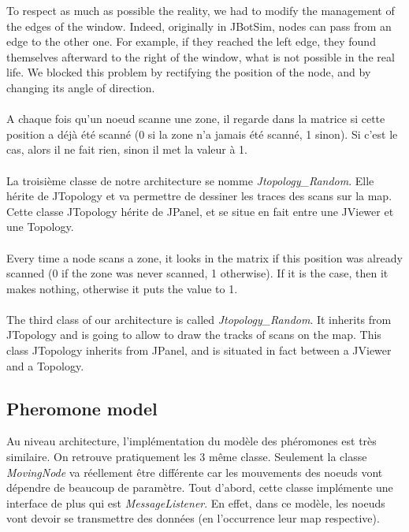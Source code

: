 To respect as much as possible the reality, we had to modify the management of the edges of the window. Indeed, originally in JBotSim, nodes can pass from an edge to the other one. For example, if they reached the left edge, they found themselves afterward to the right of the window, what is not possible in the real life. We blocked this problem by rectifying the position of the node, and by changing its angle of direction. \\\\

A chaque fois qu'un noeud scanne une zone, il regarde dans la matrice si cette position a déjà été scanné (0 si la zone n'a jamais été scanné, 1 sinon). Si c'est le cas, alors il ne fait rien, sinon il met la valeur à 1.\\\\

La troisième classe de notre architecture se nomme \textit{Jtopology\_Random}. Elle hérite de JTopology et va permettre de dessiner les traces des scans sur la map. Cette classe JTopology hérite de JPanel, et se situe en fait entre une JViewer et une Topology.\\\\

Every time a node scans a zone, it looks in the matrix if this position was already scanned (0 if the zone was never scanned, 1 otherwise). If it is the case, then it makes nothing, otherwise it puts the value to 1. \\\\

The third class of our architecture is called \textit{Jtopology\_Random}. It inherits from JTopology and is going to allow to draw the tracks of scans on the map. This class JTopology inherits from JPanel, and is situated in fact between a JViewer and a Topology.

\subsection{Pheromone model}
Au niveau architecture, l'implémentation du modèle des phéromones est très similaire. On retrouve pratiquement les 3 même classe. Seulement la classe \textit{MovingNode} va réellement être différente car les mouvements des noeuds vont dépendre de beaucoup de paramètre. Tout d'abord, cette classe implémente une interface de plus qui est \textit{MessageListener}. En effet, dans ce modèle, les noeuds vont devoir se transmettre des données (en l'occurrence leur map respective).\\\\


